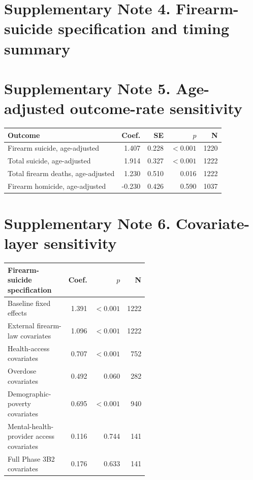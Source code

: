 \documentclass[10pt]{article}
\begin{document}
\section*{Supplementary Note 4. Firearm-suicide specification and timing summary}




\section*{Supplementary Note 5. Age-adjusted outcome-rate sensitivity}


\begin{center}
\begin{tabular}{lrrrr}
\toprule
Outcome & Coef. & SE & $p$ & N \\
\midrule
Firearm suicide, age-adjusted & 1.407 & 0.228 & $<0.001$ & 1220 \\
Total suicide, age-adjusted & 1.914 & 0.327 & $<0.001$ & 1222 \\
Total firearm deaths, age-adjusted & 1.230 & 0.510 & 0.016 & 1222 \\
Firearm homicide, age-adjusted & -0.230 & 0.426 & 0.590 & 1037 \\
\bottomrule
\end{tabular}
\end{center}

\section*{Supplementary Note 6. Covariate-layer sensitivity}


\begin{center}
\begin{tabular}{L{0.55\linewidth}rrr}
\toprule
Firearm-suicide specification & Coef. & $p$ & N \\
\midrule
Baseline fixed effects & 1.391 & $<0.001$ & 1222 \\
External firearm-law covariates & 1.096 & $<0.001$ & 1222 \\
Health-access covariates & 0.707 & $<0.001$ & 752 \\
Overdose covariates & 0.492 & 0.060 & 282 \\
Demographic-poverty covariates & 0.695 & $<0.001$ & 940 \\
Mental-health-provider access covariates & 0.116 & 0.744 & 141 \\
Full Phase 3B2 covariates & 0.176 & 0.633 & 141 \\
\bottomrule
\end{tabular}
\end{center}
\end{document}
